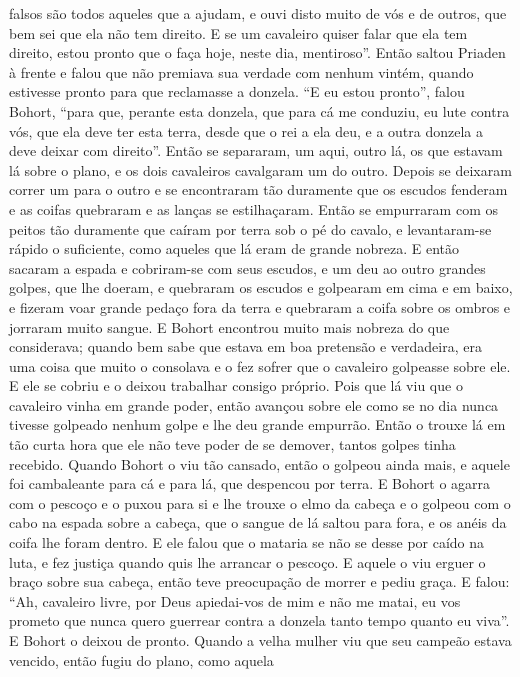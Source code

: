 falsos são todos aqueles que a ajudam, e ouvi disto muito de vós e de outros,
que bem sei que ela não tem direito. E se um cavaleiro quiser falar que ela tem
direito, estou pronto que o faça hoje, neste dia, mentiroso”. Então saltou
Priaden à frente e falou que não premiava sua verdade com nenhum vintém, quando
estivesse pronto para que reclamasse a donzela. “E eu estou pronto”, falou
Bohort, “para que, perante esta donzela, que para cá me conduziu, eu lute
contra vós, que ela deve ter esta terra, desde que o rei a ela deu, e a outra
donzela a deve deixar com direito”. Então se separaram, um aqui, outro lá, os
que estavam lá sobre o plano, e os dois cavaleiros cavalgaram um do outro.
Depois se deixaram correr um para o outro e se encontraram tão duramente que os
escudos fenderam e as coifas quebraram e as lanças se estilhaçaram. Então se
empurraram com os peitos tão duramente que caíram por terra sob o pé do cavalo,
e levantaram-se rápido o suficiente, como aqueles que lá eram de grande
nobreza. E então sacaram a espada e cobriram-se com seus escudos, e um deu ao
outro grandes golpes, que lhe doeram, e quebraram os escudos e golpearam em
cima e em baixo, e fizeram voar grande pedaço fora da terra e quebraram a coifa
sobre os ombros e jorraram muito sangue. E Bohort encontrou muito mais nobreza
do que considerava; quando bem sabe que estava em boa pretensão e verdadeira,
era uma coisa que muito o consolava e o fez sofrer que o cavaleiro golpeasse
sobre ele. E ele se cobriu e o deixou trabalhar consigo próprio. Pois que lá
viu que o cavaleiro vinha em grande poder, então avançou sobre ele como se no
dia nunca tivesse golpeado nenhum golpe e lhe deu grande empurrão. Então o
trouxe lá em tão curta hora que ele não teve poder de se demover, tantos golpes
tinha recebido. Quando Bohort o viu tão cansado, então o golpeou ainda mais, e
aquele foi cambaleante para cá e para lá, que despencou por terra. E Bohort o
agarra com o pescoço e o puxou para si e lhe trouxe o elmo da cabeça e o
golpeou com o cabo na espada sobre a cabeça, que o sangue de lá saltou para
fora, e os anéis da coifa lhe foram dentro. E ele falou que o mataria se não se
desse por caído na luta, e fez justiça quando quis lhe arrancar o pescoço. E
aquele o viu erguer o braço sobre sua cabeça, então teve preocupação de morrer
e pediu graça. E falou: “Ah, cavaleiro livre, por Deus apiedai-vos de mim e não
me matai, eu vos prometo que nunca quero guerrear contra a donzela tanto tempo
quanto eu viva”. E Bohort o deixou de pronto. Quando a velha
mulher viu que seu campeão estava vencido, então fugiu do plano, como aquela
